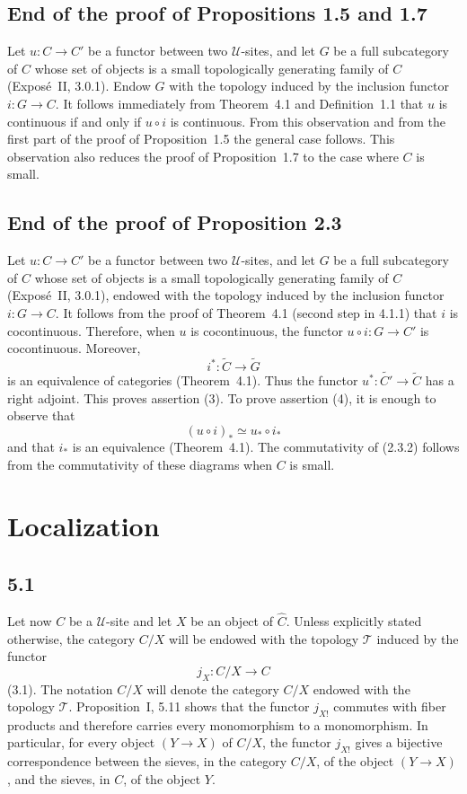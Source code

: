 \documentclass[11pt]{article}
\newcommand{\U}{\mathcal{U}}
\newcommand{\T}{\mathcal{T}}
\begin{document}
\subsection{End of the proof of Propositions 1.5 and 1.7}
Let \(u:C\to C'\) be a functor between two \(\U\)-sites, and let \(G\) be a full subcategory of \(C\) whose set of objects is a small topologically generating family of \(C\) (Expos\'e~II, 3.0.1). Endow \(G\) with the topology induced by the inclusion functor \(i:G\to C\). It follows immediately from Theorem~4.1 and Definition~1.1 that \(u\) is continuous if and only if \(u\circ i\) is continuous. From this observation and from the first part of the proof of Proposition~1.5 the general case follows. This observation also reduces the proof of Proposition~1.7 to the case where \(C\) is small.

\subsection{End of the proof of Proposition 2.3}
Let \(u:C\to C'\) be a functor between two \(\U\)-sites, and let \(G\) be a full subcategory of \(C\) whose set of objects is a small topologically generating family of \(C\) (Expos\'e~II, 3.0.1), endowed with the topology induced by the inclusion functor \(i:G\to C\). It follows from the proof of Theorem~4.1 (second step in 4.1.1) that \(i\) is cocontinuous. Therefore, when \(u\) is cocontinuous, the functor \(u\circ i:G\to C'\) is cocontinuous. Moreover,
\[
i^{\ast}:\widetilde C\to\widetilde G
\]
is an equivalence of categories (Theorem~4.1). Thus the functor \(u^{\ast}:\widetilde{C'}\to\widetilde C\) has a right adjoint. This proves assertion (3). To prove assertion (4), it is enough to observe that
\[
(u\circ i)_{\ast}\simeq u_{\ast}\circ i_{\ast}
\]
and that \(i_{\ast}\) is an equivalence (Theorem~4.1). The commutativity of (2.3.2) follows from the commutativity of these diagrams when \(C\) is small.

\section{Localization}

\subsection*{5.1}
Let now \(C\) be a \(\U\)-site and let \(X\) be an object of \(\widehat C\). Unless explicitly stated otherwise, the category \(C/X\) will be endowed with the topology \(\T\) induced by the functor
\[
j_X:C/X\to C
\]
(3.1). The notation \(C/X\) will denote the category \(C/X\) endowed with the topology \(\T\). Proposition~I, 5.11 shows that the functor \(j_{X!}\) commutes with fiber products and therefore carries every monomorphism to a monomorphism. In particular, for every object \((Y\to X)\) of \(C/X\), the functor \(j_{X!}\) gives a bijective correspondence between the sieves, in the category \(C/X\), of the object \((Y\to X)\), and the sieves, in \(C\), of the object \(Y\).
\end{document}

